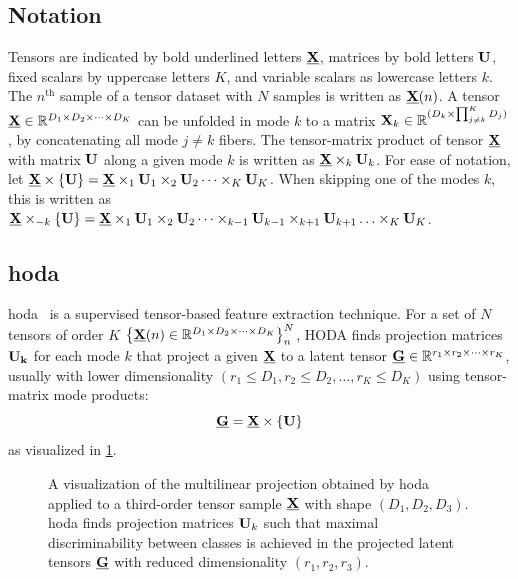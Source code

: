 \subsection{Notation}
Tensors are indicated by bold underlined letters $\ten{X}$, matrices by bold
letters $\mat{U}$, fixed scalars by uppercase letters $K$, and variable
scalars as lowercase letters $k$.
The $n^\text{th}$ sample of a tensor dataset with $N$ samples is written as
$\ten{X}(n)$.
A tensor $\ten{X}\in \mathbb{R}^{D_1\times D_2 \times \cdots \times D_K}$ can be
unfolded in mode $k$ to a matrix
$\mat{X}_k\in\mathbb{R}^{(D_k\times\prod_{j\neq k}^K D_j)}$, by concatenating
all mode $j\neq k$ fibers.
The tensor-matrix product of tensor $\ten{X}$ with matrix $\mat{U}$ along a
given mode $k$ is written as $\ten{X}\mpr{\mat{U}}{k}$. For ease of notation, let
$\ten{X}\mmpr{\mat{U}} =
	\ten{X}\mpr{\mat{U}}{1}\mpr{\mat{U}}{2}\cdots\mpr{\mat{U}}{K}$.
When skipping one of the modes $k$, this is
written as $\ten{X}\mmprs{\mat{U}}{k} =
	\ten{X}\mpr{\mat{U}}{1}\mpr{\mat{U}}{2}\cdots\mpr{\mat{U}}{k-1}\mpr{\mat{U}}{k+1}\ldots\mpr{\mat{U}}{K}$.

\subsection{\Acl{hoda}}
\Acl{hoda}~\cite{Phan2010} is a
supervised tensor-based feature extraction technique.
For a set of $N$ tensors of order $K$
$\left\{\ten{X}(n)\in\mathbb{R}^{D_1\times D_2 \times \cdots \times
		D_K}\right\}_n^N$, HODA finds projection matrices $\mat{U_k}$ for each mode $k$
that project a given $\ten{X}$ to a latent tensor
$\ten{G}\in\mathbb{R}^{r_1\times r_2\times\cdots\times r_K}$, usually with lower
dimensionality $(r_1\leq D_1,r_2\leq D_2,\ldots,r_K\leq D_K)$ using
tensor-matrix mode products:
\begin{equation}
	\ten{G}  = \ten{X}\mmpr{\mat{U}}
	\label{eq:HODA-backward}
\end{equation}
as visualized in \cref{fig:HODA-backward}.
\begin{figure}[t]
	\centering
	
  \caption[A \acs{hoda} backward projection.]{%
    A visualization of the multilinear projection obtained by \acf{hoda} applied to a third-order tensor
    sample $\ten{X}$ with shape $(D_1,D_2, D_3)$.
		\Ac{hoda} finds projection matrices $\mat{U}_k$ such that maximal
		discriminability between classes is achieved in the projected latent tensors
		$\ten{G}$ with reduced dimensionality $(r_1,r_2,r_3)$.}
	\label{fig:HODA-backward}
\end{figure}

